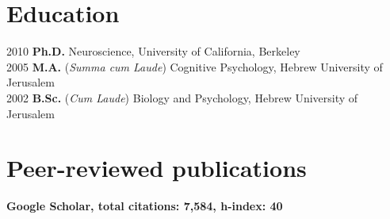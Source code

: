 \documentclass[11pt,fullpage]{article}
\begin{document}
\section*{Education}

	2010  {\bf Ph.D. } Neuroscience, University of California, Berkeley \\
	2005  {\bf M.A.} (\emph{Summa cum Laude}) Cognitive Psychology, Hebrew University of Jerusalem \\
	2002  {\bf B.Sc.} (\emph{Cum Laude}) Biology and Psychology, Hebrew University of Jerusalem \\


\section*{Peer-reviewed publications}

\textbf{Google Scholar, total citations: 7,584, h-index: 40}
\end{document}
